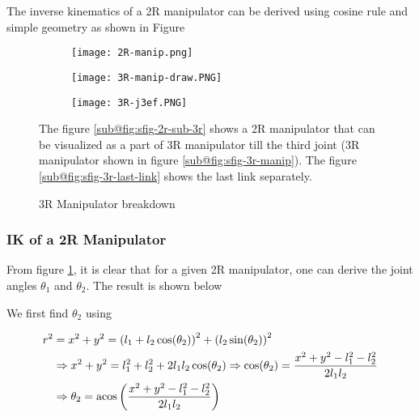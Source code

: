 The inverse kinematics of a 2R manipulator can be derived using cosine rule and simple geometry as shown in Figure

\begin{figure}[h]
    \centering
    \begin{subfigure}[b]{0.3\textwidth}
        \centering
        \texttt{[image: 2R-manip.png]}
        \caption{}
        \label{fig:sfig-2r-sub-3r}
    \end{subfigure}
    \begin{subfigure}[b]{0.3\textwidth}
        \centering
        \texttt{[image: 3R-manip-draw.PNG]}
        \caption{}
        \label{fig:sfig-3r-manip}
    \end{subfigure}
    \begin{subfigure}[b]{0.3\textwidth}
        \centering
        \texttt{[image: 3R-j3ef.PNG]}
        \caption{}
        \label{fig:sfig-3r-last-link}
    \end{subfigure}
    \caption{3R Manipulator breakdown}
    \label{fig:q1-3r-groupall}
    \small
        The figure \ref{sub@fig:sfig-2r-sub-3r} shows a 2R manipulator that can be visualized as a part of 3R manipulator till the third joint (3R manipulator shown in figure \ref{sub@fig:sfig-3r-manip}). The figure \ref{sub@fig:sfig-3r-last-link} shows the last link separately.
\end{figure}

\subsubsection*{IK of a 2R Manipulator}

From figure \ref{fig:sfig-2r-sub-3r}, it is clear that for a given 2R manipulator, one can derive the joint angles $\theta_1$ and $\theta_2$. The result is shown below

We first find $\theta_2$ using

\begin{align}
    r^2 &= x^2 + y^2 = \left ( l_1 + l_2 \cos (\theta_2) \right )^2 + \left ( l_2 \sin (\theta_2) \right )^2
    \nonumber \\
    &\Rightarrow x^2 + y^2 = l_1^2 + l_2^2+2l_1l_2\cos(\theta_2)
    \Rightarrow \cos(\theta_2) = \frac{x^2 + y^2 - l_1^2 - l_2^2}{2l_1l_2}
    \nonumber \\
    &\Rightarrow \theta_2 = \textup{acos} \left ( \frac{x^2 + y^2 - l_1^2 - l_2^2}{2l_1l_2} \right )
    \label{eq:2r-ik-t2}
\end{align}

